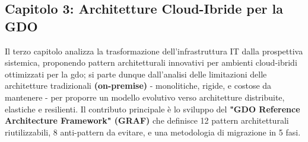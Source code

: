 
      
      



\subsection{Capitolo 3: Architetture Cloud-Ibride per la GDO}

\label{ssec:struttura_cap3}
Il terzo capitolo analizza la trasformazione dell'infrastruttura IT dalla prospettiva sistemica, proponendo pattern architetturali innovativi per ambienti cloud-ibridi ottimizzati per la \gls{gdo}; si parte dunque dall'analisi delle limitazioni delle architetture tradizionali \textbf{(on-premise)} - monolitiche, rigide, e costose da mantenere - per proporre un modello evolutivo verso architetture distribuite, elastiche e resilienti. Il contributo principale è lo sviluppo del \textbf{"GDO Reference Architecture Framework" (GRAF)} che definisce 12 pattern architetturali riutilizzabili, 8 anti-pattern da evitare, e una metodologia di migrazione in 5 fasi.

